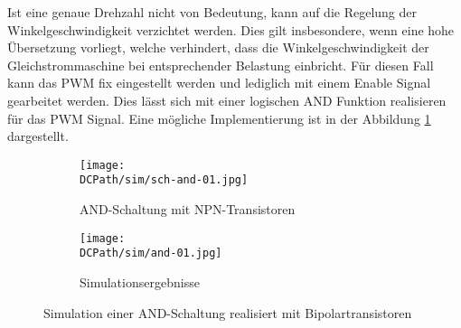 \noindent Ist eine genaue Drehzahl nicht von Bedeutung, kann auf die Regelung der
Winkelgeschwindigkeit verzichtet werden. Dies gilt insbesondere, wenn eine
hohe Übersetzung vorliegt, welche verhindert, dass die Winkelgeschwindigkeit
der Gleichstrommaschine bei entsprechender Belastung einbricht. Für diesen
Fall kann das PWM fix eingestellt werden und lediglich mit einem Enable
Signal gearbeitet werden. Dies lässt sich mit einer logischen AND Funktion
realisieren für das PWM Signal. Eine mögliche Implementierung ist in der
Abbildung \ref{fig:and} dargestellt.

\begin{figure}[h!]
    \centering
    \begin{subfigure}[b]{0.45\textwidth}
        \texttt{[image: \\DCPath/sim/sch-and-01.jpg]}
        \caption{AND-Schaltung mit NPN-Transistoren}
    \end{subfigure}
    \begin{subfigure}[b]{0.45\textwidth}
        \texttt{[image: \\DCPath/sim/and-01.jpg]}
        \caption{Simulationsergebnisse}
    \end{subfigure}
    \caption{Simulation einer AND-Schaltung realisiert mit
        Bipolartransistoren}
    \label{fig:and}
\end{figure}

